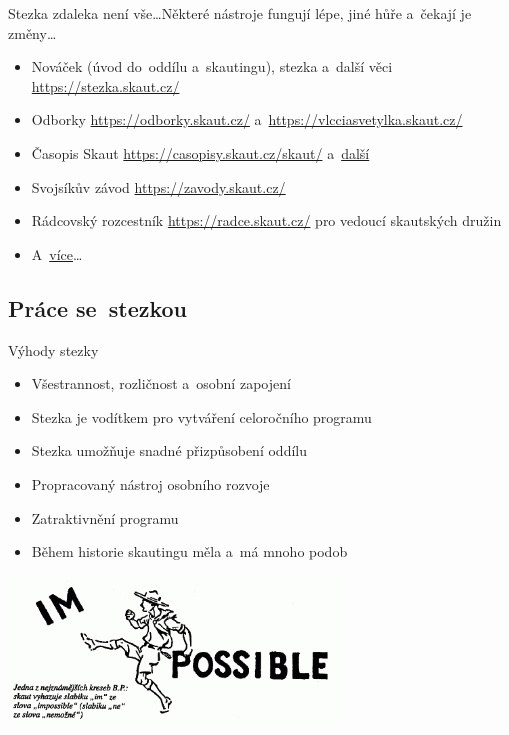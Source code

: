 \documentclass[compress, xelatex, 11pt, xcolor=dvipsnames, print, aspectratio=169,
	hyperref={
		bookmarks=true,
		unicode=true,
		colorlinks=true,
		pdftitle={Skautska vychovna metoda},
		plainpages=false,
		pdfauthor={Vojtech Zeisek},
		pdfsubject={Skautska vychovna metoda a jeji vyvoj za posledni stoleti a desetileti},
		pdfcreator={XeLaTeX},
		pdfkeywords={Junak, Pedagogika, Skaut, Skauting, Vychovna metoda},
		linkcolor=Red, %
		anchorcolor=ForestGreen, %
		citecolor=ForestGreen, %
		filecolor=ForestGreen, %
		menucolor=ForestGreen, %
		urlcolor=Sepia, %
		pdftex},
	url={hyphens, lowtilde} %
	]{beamer}
\begin{document}
\begin{frame}{Stezka zdaleka není vše\ldots}{Některé nástroje fungují lépe, jiné hůře a~čekají je změny\ldots}
	\begin{itemize}
		\item Nováček (úvod do~oddílu a~skautingu), stezka a~další věci \url{https://stezka.skaut.cz/}
		\item Odborky \url{https://odborky.skaut.cz/} a~\url{https://vlcciasvetylka.skaut.cz/}
		\item Časopis Skaut \url{https://casopisy.skaut.cz/skaut/} a~\href{https://casopisy.skaut.cz/}{další}
		\item Svojsíkův závod \url{https://zavody.skaut.cz/}
		\item Rádcovský rozcestník \url{https://radce.skaut.cz/} pro vedoucí skautských družin
		\item A~\href{https://krizovatka.skaut.cz/vedu-oddil}{více}\ldots
	\end{itemize}
\end{frame}

\subsection{Práce se~stezkou}

\begin{frame}{Výhody stezky}
	\begin{itemize}
		\item Všestrannost, rozličnost a~osobní zapojení
		\item Stezka je vodítkem pro vytváření celoročního programu
		\item Stezka umožňuje snadné přizpůsobení oddílu
		\item Propracovaný nástroj osobního rozvoje
		\item Zatraktivnění programu
		\item Během historie skautingu měla a~má mnoho podob
	\end{itemize}
	\begin{center}
		\includegraphics[height=4cm]{im-possible_m.png}
	\end{center}
\end{frame}
\end{document}
